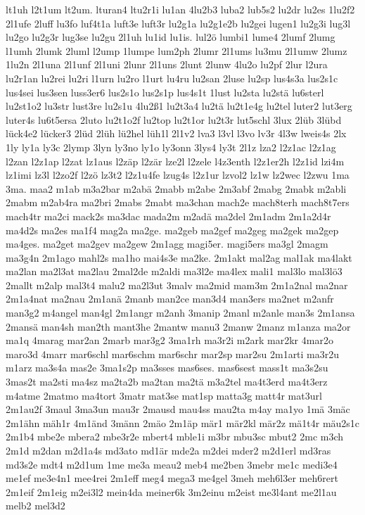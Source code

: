 {lt1uh
l2t1um
lt2um.
lturan4
ltu2r1i
lu1an
4lu2b3
luba2
lub5s2
lu2dr
lu2es
1lu2f2
2l1ufe
2luff
lu3fo
luf4t1a
luft3e
luft3r
lu2g1a
lu2g1e2b
lu2gei
lugen1
lu2g3i
lug3l
lu2go
lu2g3r
lug3se
lu2gu
2l1uh
lu1id
lu1is.
lul2ö
lumbi1
lume4
2lumf
2lumg
l1umh
2lumk
2luml
l2ump
1lumpe
lum2ph
2lumr
2l1ums
lu3mu
2l1umw
2lumz
1lu2n
2l1una
2l1unf
2l1uni
2lunr
2l1uns
2lunt
2lunw
4lu2o
lu2pf
2lur
l2ura
lu2r1an
lu2rei
lu2ri
l1urn
lu2ro
l1urt
lu4ru
lu2san
2luse
lu2sp
lus4s3a
lus2s1c
lus4sei
lus3sen
luss3er6
lus2s1o
lus2s1p
lus4s1t
1lust
lu2sta
lu2stä
lu6sterl
lu2st1o2
lu3str
lust3re
lu2s1u
4lu2ß1
lu2t3a4
lu2tä
lu2t1e4g
lu2tel
luter2
lut3erg
luter4s
lu6t5ersa
2luto
lu2t1o2f
lu2top
lu2t1or
lu2t3r
lut5schl
3lux
2lüb
3lübd
lück4e2
lücker3
2lüd
2lüh
lü2hel
lüh1l
2l1v2
lva3
l3vl
l3vo
lv3r
4l3w
lweis4s
2lx
1ly
ly1a
ly3c
2lymp
3lyn
ly3no
ly1o
ly3onn
3lys4
ly3t
2l1z
lza2
l2z1ac
l2z1ag
l2zan
l2z1ap
l2zat
lz1aus
l2zäp
l2zär
lze2l
l2zele
l4z3enth
l2z1er2h
l2z1id
lzi4m
lz1imi
lz3l
l2zo2f
l2zö
lz3t2
l2z1u4fe
lzug4s
l2z1ur
lzvol2
lz1w
lz2wec
l2zwu
1ma
3ma.
maa2
m1ab
m3a2bar
m2abä
2mabb
m2abe
2m3abf
2mabg
2mabk
m2abli
2mabm
m2ab4ra
ma2bri
2mabs
2mabt
ma3chan
mach2e
mach8terh
mach8t7ers
mach4tr
ma2ci
mack2s
ma3dac
mada2m
m2adä
ma2del
2m1adm
2m1a2d4r
ma4d2s
ma2es
ma1f4
mag2a
ma2ge.
ma2geb
ma2gef
ma2geg
ma2gek
ma2gep
ma4ges.
ma2get
ma2gev
ma2gew
2m1agg
magi5er.
magi5ers
ma3gl
2magm
ma3g4n
2m1ago
mahl2s
ma1ho
mai4s3e
ma2ke.
2m1akt
mal2ag
mal1ak
ma4lakt
ma2lan
ma2l3at
ma2lau
2mal2de
m2aldi
ma3l2e
ma4lex
mali1
mal3lo
mal3lö3
2mallt
m2alp
mal3t4
malu2
ma2l3ut
3malv
ma2mid
mam3m
2m1a2nal
ma2nar
2m1a4nat
ma2nau
2m1anä
2manb
man2ce
man3d4
man3ers
ma2net
m2anfr
man3g2
m4angel
man4gl
2m1angr
m2anh
3manip
2manl
m2anle
man3s
2m1ansa
2mansä
man4sh
man2th
mant3he
2mantw
manu3
2manw
2manz
m1anza
ma2or
ma1q
4marag
mar2an
2marb
mar3g2
3ma1rh
ma3r2i
m2ark
mar2kr
4mar2o
maro3d
4marr
mar6schl
mar6schm
mar6schr
mar2sp
mar2su
2m1arti
ma3r2u
m1arz
ma3s4a
mas2e
3ma1s2p
ma3sses
mas6ses.
mas6sest
mass1t
ma3s2su
3mas2t
ma2sti
ma4sz
ma2ta2b
ma2tan
ma2tä
m3a2tel
ma4t3erd
ma4t3erz
m4atme
2matmo
ma4tort
3matr
mat3se
mat1sp
matta3g
matt4r
mat3url
2m1au2f
3maul
3ma3un
mau3r
2mausd
mau4ss
mau2ta
m4ay
ma1yo
1mä
3mäc
2m1ähn
mäh1r
4m1änd
3männ
2mäo
2m1äp
mär1
mär2kl
mär2z
mä1t4r
mäu2s1c
2m1b4
mbe2e
mbera2
mbe3r2e
mbert4
mble1i
m3br
mbu3sc
mbut2
2mc
m3ch
2m1d
m2dan
m2d1a4s
md3ato
md1är
mde2a
m2dei
mder2
m2d1erl
md3ras
md3s2e
mdt4
m2d1um
1me
me3a
meau2
meb4
me2ben
3mebr
me1c
medi3e4
me1ef
me3e4n1
mee4rei
2m1eff
meg4
mega3
me4gel
3meh
meh6l3er
meh6rert
2m1eif
2m1eig
m2ei3l2
mein4da
meiner6k
3m2einu
m2eist
me3l4ant
me2l1au
melb2
mel3d2
}
